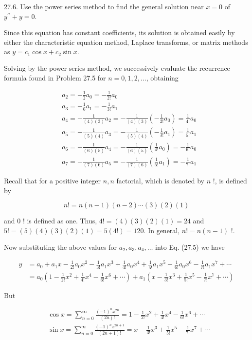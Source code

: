 \documentclass[10pt]{article}
\begin{document}
27.6. Use the power series method to find the general solution near $x=0$ of $y^{\prime \prime}+y=0$.

Since this equation has constant coefficients, its solution is obtained easily by either the characteristic equation method, Laplace transforms, or matrix methods as $y=c_{1} \cos x+c_{2} \sin x$.

Solving by the power series method, we successively evaluate the recurrence formula found in Problem 27.5 for $n=0,1,2, \ldots$, obtaining

$$
\begin{aligned}
& a_{2}=-\frac{1}{2} a_{0}=-\frac{1}{2 !} a_{0} \\
& a_{3}=-\frac{1}{6} a_{1}=-\frac{1}{3 !} a_{1} \\
& a_{4}=-\frac{1}{(4)(3)} a_{2}=-\frac{1}{(4)(3)}\left(-\frac{1}{2 !} a_{0}\right)=\frac{1}{4 !} a_{0} \\
& a_{5}=-\frac{1}{(5)(4)} a_{3}=-\frac{1}{(5)(4)}\left(-\frac{1}{3 !} a_{1}\right)=\frac{1}{5 !} a_{1} \\
& a_{6}=-\frac{1}{(6)(5)} a_{4}=-\frac{1}{(6)(5)}\left(\frac{1}{4 !} a_{0}\right)=-\frac{1}{6 !} a_{0} \\
& a_{7}=-\frac{1}{(7)(6)} a_{5}=-\frac{1}{(7)(6)}\left(\frac{1}{5 !} a_{1}\right)=-\frac{1}{7 !} a_{1}
\end{aligned}
$$

Recall that for a positive integer $n, n$ factorial, which is denoted by $n$ !, is defined by

$$
n !=n(n-1)(n-2) \cdots(3)(2)(1)
$$

and 0 ! is defined as one. Thus, $4 !=(4)(3)(2)(1)=24$ and $5 !=(5)(4)(3)(2)(1)=5(4 !)=120$. In general, $n !=n(n-1)$ !.

Now substituting the above values for $a_{2}, a_{3}, a_{4}, \ldots$ into Eq. (27.5) we have


\begin{align*}
y & =a_{0}+a_{1} x-\frac{1}{2 !} a_{0} x^{2}-\frac{1}{3 !} a_{1} x^{3}+\frac{1}{4 !} a_{0} x^{4}+\frac{1}{5 !} a_{1} x^{5}-\frac{1}{6 !} a_{0} x^{6}-\frac{1}{7 !} a_{1} x^{7}+\cdots \\
& =a_{0}\left(1-\frac{1}{2 !} x^{2}+\frac{1}{4 !} x^{4}-\frac{1}{6 !} x^{6}+\cdots\right)+a_{1}\left(x-\frac{1}{3 !} x^{3}+\frac{1}{5 !} x^{5}-\frac{1}{7 !} x^{7}+\cdots\right) \tag{1}
\end{align*}


But

$$
\begin{aligned}
& \cos x=\sum_{n=0}^{\infty} \frac{(-1)^{n} x^{2 n}}{(2 n) !}=1-\frac{1}{2 !} x^{2}+\frac{1}{4 !} x^{4}-\frac{1}{6 !} x^{6}+\cdots \\
& \sin x=\sum_{n=0}^{\infty} \frac{(-1)^{n} x^{2 n+1}}{(2 n+1) !}=x-\frac{1}{3 !} x^{3}+\frac{1}{5 !} x^{5}-\frac{1}{7 !} x^{7}+\cdots
\end{aligned}
$$
\end{document}
